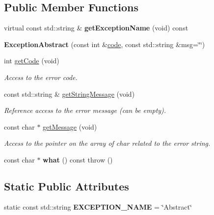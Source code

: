 \subsection*{Public Member Functions}
\begin{DoxyCompactItemize}
\item 
\mbox{\label{classdynamic__graph_1_1ExceptionAbstract_ae19954007c54dc6de94aa02e2fe4212b}} 
virtual const std\+::string \& {\bfseries get\+Exception\+Name} (void) const
\item 
\mbox{\label{classdynamic__graph_1_1ExceptionAbstract_a92d849e378aca22a59aa5294ed9717bb}} 
{\bfseries Exception\+Abstract} (const int \&\hyperlink{classdynamic__graph_1_1ExceptionAbstract_a160cf3cd35aad75738f8b26c5cec6fdc}{code}, const std\+::string \&msg=\char`\"{}\char`\"{})
\item 
int \hyperlink{classdynamic__graph_1_1ExceptionAbstract_a4b3009fb1517a2e382026c31ef618526}{get\+Code} (void)
\begin{DoxyCompactList}\small\item\em Access to the error code. \end{DoxyCompactList}\item 
const std\+::string \& \hyperlink{classdynamic__graph_1_1ExceptionAbstract_ab43a64baae9d779737b03c7c1fbb6919}{get\+String\+Message} (void)
\begin{DoxyCompactList}\small\item\em Reference access to the error message (can be empty). \end{DoxyCompactList}\item 
const char $\ast$ \hyperlink{classdynamic__graph_1_1ExceptionAbstract_aa7b63b9c5529a7d07d5a9a880bf9a0a5}{get\+Message} (void)
\begin{DoxyCompactList}\small\item\em Access to the pointer on the array of {\itshape char} related to the error string. \end{DoxyCompactList}\item 
\mbox{\label{classdynamic__graph_1_1ExceptionAbstract_a43a326a7305d53510695a8a5036d5455}} 
const char $\ast$ {\bfseries what} () const  throw ()
\end{DoxyCompactItemize}
\subsection*{Static Public Attributes}
\begin{DoxyCompactItemize}
\item 
\mbox{\label{classdynamic__graph_1_1ExceptionAbstract_a3fe66d505c81575f26360298171c9e50}} 
static const std\+::string {\bfseries E\+X\+C\+E\+P\+T\+I\+O\+N\+\_\+\+N\+A\+ME} = \char`\"{}Abstract\char`\"{}
\end{DoxyCompactItemize}

